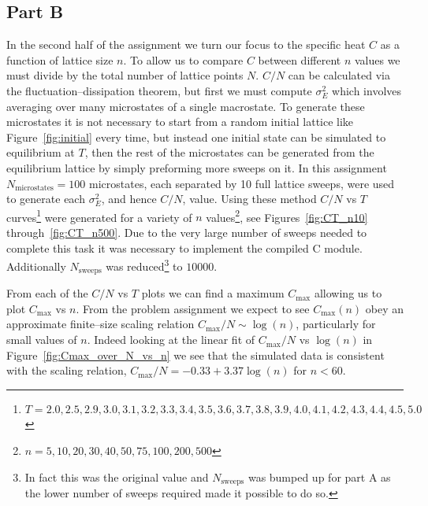\documentclass[notitlepage,aps,prd,nofootinbib]{revtex4-1}
\begin{document}
\clearpage
\subsection{Part B}
\label{subsec:results_part_b}
In the second half of the assignment we turn our focus to the specific heat $C$ as a function of lattice size $n$. To allow us to compare $C$ between different $n$ values we must divide by the total number of lattice points $N$. $C/N$ can be calculated via the fluctuation--dissipation theorem, but first we must compute $\sigma_{E}^{2}$ which involves averaging over many microstates of a single macrostate. To generate these microstates it is not necessary to start from a random initial lattice like Figure~\ref{fig:initial} every time, but instead one initial state can be simulated to equilibrium at $T$, then the rest of the microstates can be generated from the equilibrium lattice by simply preforming more sweeps on it. In this assignment $N_{\mathrm{microstates}} = 100$ microstates, each separated by 10 full lattice sweeps, were used to generate each $\sigma_{E}^{2}$, and hence $C/N$, value. Using these method $C/N$ vs $T$ curves\footnote{$T = 2.0, 2.5, 2.9, 3.0, 3.1, 3.2, 3.3, 3.4, 3.5, 3.6, 3.7, 3.8, 3.9, 4.0, 4.1, 4.2, 4.3, 4.4, 4.5, 5.0$} were generated for a variety of $n$ values\footnote{$n = 5, 10, 20, 30, 40, 50, 75, 100, 200, 500$}, see Figures~\ref{fig:CT_n10} through~\ref{fig:CT_n500}. Due to the very large number of sweeps needed to complete this task it was necessary to implement the compiled C module. Additionally $N_{\mathrm{sweeps}}$ was reduced\footnote{In fact this was the original value and $N_{\mathrm{sweeps}}$ was bumped up for part A as the lower number of sweeps required made it possible to do so.} to $10000$.

From each of the $C/N$ vs $T$ plots we can find a maximum $C_{\mathrm{max}}$ allowing us to plot $C_{\mathrm{max}}$ vs $n$. From the problem assignment we expect to see $C_{\mathrm{max}}\left(n\right)$ obey an approximate finite--size scaling relation $C_{\mathrm{max}}/N \sim \log(n)$, particularly for small values of $n$. Indeed looking at the linear fit of  $C_{\mathrm{max}}/N$ vs $\log(n)$ in Figure~\ref{fig:Cmax_over_N_vs_n} we see that the simulated data is consistent with the scaling relation, $C_{\mathrm{max}}/N = -0.33 + 3.37 \log(n)$ for $n < 60$.
\end{document}
